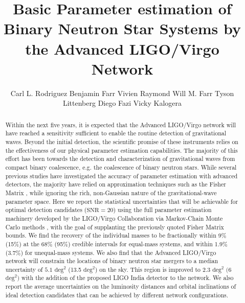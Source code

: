 \documentclass[11pt,a4paper]{emulateapj} 
\newcommand{\carl}[1]{{\color{red} #1}}
\begin{document}
\title{Basic Parameter estimation of Binary Neutron Star Systems by
  the Advanced LIGO/Virgo Network} \author{Carl L. Rodriguez
Benjamin Farr 
Vivien Raymond  Will M. Farr 
Tyson Littenberg
Diego Fazi
Vicky Kalogera}

 



\begin{abstract}

Within the next five years, it is expected that the Advanced LIGO/Virgo network will have
reached a sensitivity sufficient to enable the routine detection of
gravitational waves.  Beyond the initial detection, the scientific
promise of these instruments relies on the effectiveness of our physical
parameter estimation capabilities. The majority of this effort has been towards the
detection and characterization of gravitational waves from compact
binary coalescence, e.g. the coalescence of binary neutron stars.
While several previous studies have investigated the accuracy of parameter
estimation with advanced detectors, the majority have relied
on approximation techniques such as the Fisher Matrix\carl{, while ignoring the rich, non-Gaussian
nature of the gravitational-wave parameter space}.  Here we report the
statistical uncertainties that will be achievable for optimal detection candidates
 ($\text{SNR}=20$) using
the full parameter estimation machinery developed by the LIGO/Virgo
Collaboration via Markov-Chain Monte Carlo methods\carl{, with the goal of supplanting the previously quoted Fisher Matrix bounds}. 
 We find the recovery of the individual masses to be
fractionally within 9\% (15\%) at the 68\% (95\%) credible intervals for equal-mass
systems, and within 1.9\% (3.7\%) for unequal-mass systems.  We also find that the Advanced
LIGO/Virgo network will constrain the locations of binary neutron star mergers to a median
 uncertainty of $5.1$ $\mathrm{deg}^2$ (13.5 $\mathrm{deg}^2$) on the sky.  This region is improved to  2.3 $\mathrm{deg}^2$ $(6$ $\mathrm{deg}^2)$ with the addition of the proposed LIGO India detector to the network.  We also report the
average uncertainties on the luminosity distances and
orbital inclinations of ideal detection candidates that can be
achieved by different network configurations.
\end{abstract}
\end{document}

